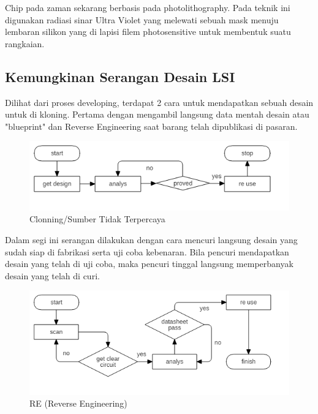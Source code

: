 Chip pada zaman sekarang berbasis pada photolithography. Pada teknik ini digunakan radiasi sinar Ultra Violet yang melewati sebuah mask menuju lembaran silikon yang di lapisi filem photosensitive untuk membentuk suatu rangkaian.

% 

\subsection{Kemungkinan Serangan Desain LSI}
Dilihat dari proses developing, terdapat 2 cara untuk mendapatkan sebuah desain untuk di kloning. Pertama dengan mengambil langsung data mentah desain atau "blueprint" dan Reverse Engineering saat barang telah dipublikasi di pasaran.

\begin{figure}
	\centering
	\includegraphics[width=1.05\textwidth]
	{diagrams/untrustSource.png}
	\caption{Clonning/Sumber Tidak Terpercaya}
	\label{fig:untrustsource}
\end{figure}

Dalam segi ini serangan dilakukan dengan cara mencuri langsung desain yang sudah siap di fabrikasi serta uji coba kebenaran. Bila pencuri mendapatkan desain yang telah di uji coba, maka pencuri tinggal langsung memperbanyak desain yang telah di curi.

\begin{figure}
	\centering
	\includegraphics[width=1.05\textwidth]
	{diagrams/reverseEngineering.png}
	\caption{RE (Reverse Engineering)}
	\label{fig:reverseengineering}
\end{figure}

